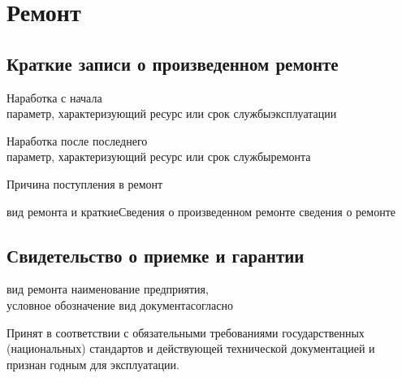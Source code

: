 \newpage

\section{Ремонт}

\subsection{Краткие записи о произведенном ремонте}

\noindent
\nameksaunumber
\bigskip
\noindent
{}

\bigskip
\noindent
Наработка с начала\\
\blankfieldtxt[c]{\textwidth}{}
  {параметр, характеризующий ресурс или срок службы}{эксплуатации}{}

\bigskip
\noindent
Наработка после последнего\\ 
\blankfieldtxt[c]{\textwidth}{}
  {параметр, характеризующий ресурс или срок службы}{ремонта}{}

\noindent
\blankfieldtxt[c]{\textwidth}{}
  {}{Причина поступления в ремонт}{}

\noindent
\blankfieldtxt[c]{\textwidth}{}
  {}{}{}

\noindent%
\blankfieldtxt[c]{\textwidth}{}
  {вид ремонта и краткие}{Сведения о произведенном ремонте}{}
\noindent
\blankfieldtxt[c]{\textwidth}{}
  {сведения о ремонте}{}{}

\noindent\blankfieldtxt[c]{\textwidth}{}
  {}{}{}

\newpage

\subsection{Свидетельство о приемке и гарантии}
\noindent
\nameksaunumber

\noindent
{}
  {вид ремонта}{}{}\hfill 
{}
  {наименование предприятия, \\ условное обозначение}{}{}\hfill
{}
  {вид документа}{согласно}{}

\bigskip
\noindent Принят в соответствии с обязательными требованиями 
государственных (национальных) стандартов и действующей технической 
документацией и признан годным для эксплуатации.

